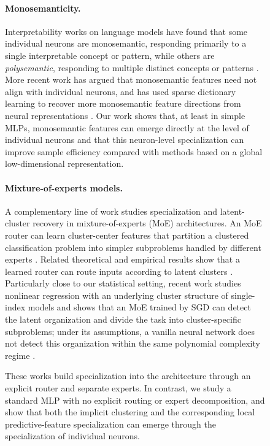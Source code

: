 \documentclass{article}
\newcounter{setting}[section]
\newcounter{model}[section]
\begin{document}
\begin{figure}
\paragraph{Monosemanticity.}
Interpretability works on language models have found that some individual neurons are monosemantic, responding primarily to a single interpretable concept or pattern, while others are \emph{polysemantic}, responding to multiple distinct concepts or patterns \citep{bills2023language,elhage2022solu}. More recent work
has argued that monosemantic features need not align with individual neurons,
and has used sparse dictionary learning to recover more monosemantic feature
directions from neural representations
\citep{bricken2023monosemanticity,templeton2024scaling}. Our work shows that,
at least in simple MLPs, monosemantic features can emerge directly at the level
of individual neurons and that this neuron-level specialization can improve
sample efficiency compared with methods based on a global low-dimensional representation.
\paragraph{Mixture-of-experts models.} A complementary line of work studies specialization and latent-cluster recovery in mixture-of-experts (MoE) architectures. An MoE router can learn cluster-center features that partition a clustered classification problem into simpler subproblems handled by different experts \citep{chen2022towards}. Related theoretical and empirical results show that a learned router can route inputs according to latent clusters \citep{dikkala-etal-2023-benefits}. Particularly close to our statistical setting, recent work studies nonlinear regression with an underlying cluster structure of single-index models and shows that an MoE trained by SGD can detect the latent organization and divide the task into cluster-specific subproblems; under its assumptions, a vanilla neural network does not detect this organization within the same polynomial complexity regime \citep{pmlr-v267-kawata25a}.

These works build specialization into the architecture through an explicit router and separate experts. In contrast, we study a standard MLP with no explicit routing or expert decomposition, and show that both the implicit clustering and the corresponding local predictive-feature specialization can emerge through the specialization of individual neurons.



\end{figure}
\end{document}
